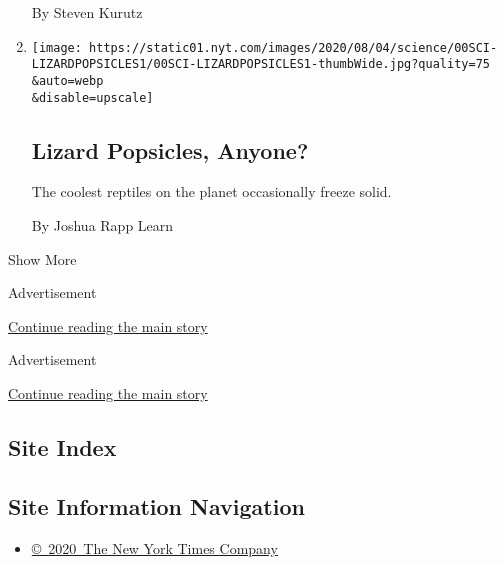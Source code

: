 \begin{enumerate}
  By Steven Kurutz
\item
  \href{/2020/07/31/science/lizards-liolaemus-argentina.html}{}

  \texttt{[image: https://static01.nyt.com/images/2020/08/04/science/00SCI-LIZARDPOPSICLES1/00SCI-LIZARDPOPSICLES1-thumbWide.jpg?quality=75\\\&auto=webp\\\&disable=upscale]}

  \hypertarget{lizard-popsicles-anyone}{%
  \subsection{Lizard Popsicles, Anyone?}\label{lizard-popsicles-anyone}}

  The coolest reptiles on the planet occasionally freeze solid.

  By Joshua Rapp Learn
\end{enumerate}

Show More

Advertisement

\protect\hyperlink{after-mid1}{Continue reading the main story}

Advertisement

\protect\hyperlink{after-mktg}{Continue reading the main story}

\hypertarget{site-index}{%
\subsection{Site Index}\label{site-index}}

\hypertarget{site-information-navigation}{%
\subsection{Site Information
Navigation}\label{site-information-navigation}}

\begin{itemize}
\tightlist
\item
  \href{https://help.nytimes.com/hc/en-us/articles/115014792127-Copyright-notice}{©~2020~The
  New York Times Company}
\end{itemize}

